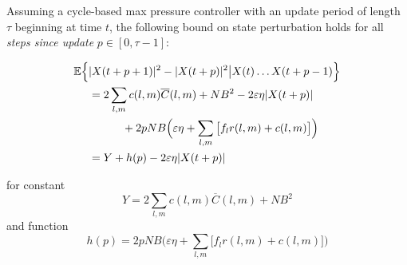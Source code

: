 \begin{Lem} \label{lemma_p} 
Assuming a cycle-based max pressure controller with an update period of length $\tau$ beginning at time $t$, the following bound on state perturbation holds for all \emph{steps since update} $p \in [0, \tau - 1]$:
\begin{small}
\begin{align} \label{pexpect} 
\expectation{&\vert X(t + p + 1)\vert^2 - \vert X(t + p)\vert^2 \big| X(t) \ldots X(t + p - 1)} \\ \nonumber
& = 2 \sum_{l,m} c(l,m)\overline{C}(l,m) + N B^2 -2\varepsilon \eta \vert X(t + p )\vert  \\
& \qquad \quad+ 2pNB\Big(\varepsilon\eta +  \sum_{l,m}\big[f_{l}r(l,m) + c(l,m)\big]\Big)  \label{boundCycleMP} \\
& =  Y + h(p) - 2\varepsilon \eta \vert X(t + p )\vert \nonumber
\end{align}
\end{small}
for constant 
\begin{equation}Y = 2 \sum_{l,m} c(l,m)\overline{C}(l,m) + N B^2 \end{equation} 
and function 
\begin{equation} 
h(p) =  2 pNB\Big(\varepsilon\eta +  \sum_{l,m}\big[f_{l}r(l,m) + c(l,m)\big]\Big)  
\end{equation}
\end{Lem}
